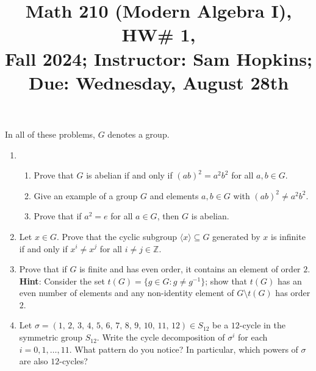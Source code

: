 \documentclass[11pt]{article}
\title{Math 210 (Modern Algebra I), HW\# 1, \\ {\normalsize Fall 2024; Instructor: Sam Hopkins; Due: Wednesday, August 28th}}
\date{}
\begin{document}
\maketitle

\thispagestyle{empty}

In all of these problems, $G$ denotes a group.

\begin{enumerate}

\item \begin{enumerate}
\item Prove that $G$ is abelian if and only if $(ab)^2=a^2b^2$ for all $a,b\in G$. 
\item Give an example of a group $G$ and elements $a,b\in G$ with $(ab)^2\neq a^2b^2$.
\item Prove that if $a^2 = e$ for all $a\in G$, then $G$ is abelian.
\end{enumerate}

\item Let $x\in G$. Prove that the cyclic subgroup $\langle x \rangle \subseteq G$ generated by $x$ is infinite if and only if $x^{i} \neq x^{j}$ for all $i \neq j \in \mathbb{Z}$.

\item Prove that if $G$ is finite and has even order, it contains an element of order $2$. \\ {\bf Hint}: Consider the set $t(G) = \{g \in G\colon g \neq g^{-1}\}$; show that $t(G)$ has an even number of elements and any non-identity element of $G\setminus t(G)$ has order $2$.

\item Let $\sigma = (1, \, 2, \, 3, \, 4, \, 5, \, 6, \, 7, \, 8, \, 9, \, 10, \, 11, \, 12) \in S_{12}$ be a $12$-cycle in the symmetric group $S_{12}$. Write the cycle decomposition of $\sigma^i$ for each $i=0,1,\ldots,11$. What pattern do you notice? In particular, which powers of $\sigma$ are also $12$-cycles?

\end{enumerate}
\end{document}
